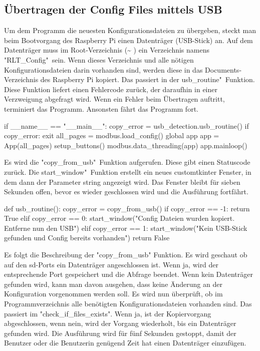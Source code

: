 \subsection{Übertragen der Config Files mittels USB}
Um dem Programm die neuesten Konfigurationsdateien zu übergeben, steckt man beim Bootvorgang des Raspberry Pi einen Datenträger (USB-Stick) an. Auf dem Datenträger muss im Root-Verzeichnis (\textasciitilde
) ein Verzeichnis namens "RLT\_Config"\ sein. Wenn dieses Verzeichnis und alle nötigen Konfigurationsdateien darin vorhanden sind, werden diese in das Documents-Verzeichnis des Raspberry Pi kopiert. Das passiert in der \dq usb\_routine"\ Funktion. Diese Funktion liefert einen Fehlercode zurück, der daraufhin in einer Verzweigung abgefragt wird. Wenn ein Fehler beim Übertragen auftritt, terminiert das Programm. Ansonsten fährt das Programm fort.


\begin{pythoncode}
if __name__ == "__main__":
	copy_error = usb_detection.usb_routine()
	if copy_error:
		exit
	all_pages = modbus.load_config()
	global app
	app = App(all_pages)
	setup_buttons()
	modbus.data_threading(app)
	app.mainloop()	
\end{pythoncode}

Es wird die "copy\_from\_usb"\ Funktion aufgerufen. Diese gibt einen Statuscode zurück. Die \dq start\_window"\ Funktion erstellt ein neues customtkinter Fenster, in dem dann der Parameter string angezeigt wird. Das Fenster bleibt für sieben Sekunden offen, bevor es wieder geschlossen wird und die Ausführung fortfährt.

\begin{pythoncode}
def usb_routine():
	copy_error = copy_from_usb()
	if copy_error == -1:
		return True
	elif copy_error == 0:
		start_window("Config Dateien wurden kopiert. Entferne nun den USB")   
	elif copy_error == 1: 
		start_window("Kein USB-Stick gefunden und Config bereits vorhanden")  
	return False
\end{pythoncode}

Es folgt die Beschreibung der "copy\_from\_usb" Funktion. Es wird geschaut ob auf den sd-Ports ein Datenträger angeschlossen ist. Wenn ja, wird der entsprechende Port gespeichert und die Abfrage beendet. Wenn kein Datenträger gefunden wird, kann man davon ausgehen, dass keine Änderung an der Konfiguration vorgenommen werden soll. Es wird nun überprüft, ob im Programmverzeichnis alle benötigten Konfigurationsdateien vorhanden sind. Das passiert im "check\_if\_files\_exists". Wenn ja, ist der Kopiervorgang abgeschlossen, wenn nein, wird der Vorgang wiederholt, bis ein Datenträger gefunden wird. Die Ausführung wird für fünf Sekunden gestoppt, damit der Benutzer oder die Benutzerin genügend Zeit hat einen Datenträger einzufügen.

